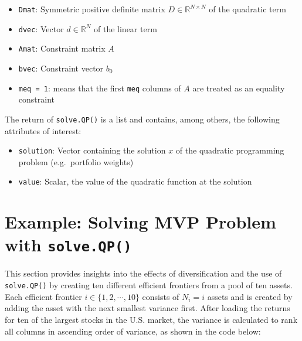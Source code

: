 \documentclass[
  oneside]{book}
\providecommand{\tightlist}{%
  \setlength{\itemsep}{0pt}\setlength{\parskip}{0pt}}
\begin{document}
\vspace{-0.4cm}

\begin{itemize}
\tightlist
\item
  \texttt{Dmat}: Symmetric positive definite matrix \(D \in \mathbb{R}^{N \times N}\) of the quadratic term
\item
  \texttt{dvec}: Vector \(d \in \mathbb{R}^{N}\) of the linear term
\item
  \texttt{Amat}: Constraint matrix \(A\)
\item
  \texttt{bvec}: Constraint vector \(b_0\)
\item
  \texttt{meq\ =\ 1}: means that the first \texttt{meq} columns of \(A\) are treated as an equality constraint
\end{itemize}

The return of \texttt{solve.QP()} is a list and contains, among others, the following attributes of interest:

\vspace{-0.4cm}

\begin{itemize}
\tightlist
\item
  \texttt{solution}: Vector containing the solution \(x\) of the quadratic programming problem (e.g.~portfolio weights)
\item
  \texttt{value}: Scalar, the value of the quadratic function at the solution
\end{itemize}

\hypertarget{exampleanalyticalmvp}{%
\section{\texorpdfstring{Example: Solving MVP Problem with \texttt{solve.QP()}}{Example: Solving MVP Problem with solve.QP()}}\label{exampleanalyticalmvp}}

This section provides insights into the effects of diversification and the use of \texttt{solve.QP()} by creating ten different efficient frontiers from a pool of ten assets. Each efficient frontier \(i \in \{1, 2, \cdots, 10\}\) consists of \(N_i = i\) assets and is created by adding the asset with the next smallest variance first. After loading the returns for ten of the largest stocks in the U.S. market, the variance is calculated to rank all columns in ascending order of variance, as shown in the code below:
\end{document}
